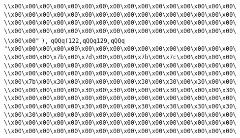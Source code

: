 \verb|\\x00\x00\x00\x00\x00\x00\x00\x00\x00\x00\x00\x00\x00\x00\x00\x00\|\newline
\verb|\\x00\x00\x00\x00\x00\x00\x00\x00\x00\x00\x00\x00\x00\x00\x00\x00\|\newline
\verb|\\x00\x00\x00\x00\x00\x00\x00\x00\x00\x00\x00\x00\x00\x00\x00\x00\|\newline
\verb|\\x00\x00\x00\x00\x00\x00\x00\x00\x00\x00\x00\x00\x00\x00\x00\x00\|\newline
\verb|\\x00\x00"|\newline
\verb|),|\newline
\verb|qQQq(122,qQQq129,qQQq|\newline
\verb|"\x00\x00\x00\x00\x00\x00\x00\x00\x00\x00\x00\x00\x00\x00\x00\x00\|\newline
\verb|\\x00\x00\x00\x7b\x00\x7d\x00\x00\x00\x7b\x00\x7c\x00\x00\x00\x00\|\newline
\verb|\\x00\x00\x00\x00\x00\x00\x00\x00\x00\x00\x00\x00\x00\x00\x00\x00\|\newline
\verb|\\x00\x00\x00\x00\x00\x00\x00\x00\x00\x00\x00\x00\x00\x00\x00\x00\|\newline
\verb|\\x00\x7b\x00\x30\x00\x00\x00\x00\x00\x30\x00\x30\x00\x30\x00\x00\|\newline
\verb|\\x00\x00\x00\x00\x00\x30\x00\x30\x00\x00\x00\x30\x00\x00\x00\x30\|\newline
\verb|\\x00\x00\x00\x00\x00\x00\x00\x00\x00\x00\x00\x00\x00\x00\x00\x00\|\newline
\verb|\\x00\x00\x00\x00\x00\x30\x00\x00\x00\x30\x00\x30\x00\x30\x00\x30\|\newline
\verb|\\x00\x30\x00\x00\x00\x00\x00\x00\x00\x00\x00\x00\x00\x00\x00\x00\|\newline
\verb|\\x00\x00\x00\x00\x00\x00\x00\x00\x00\x00\x00\x00\x00\x00\x00\x00\|\newline
\verb|\\x00\x00\x00\x00\x00\x00\x00\x00\x00\x00\x00\x00\x00\x00\x00\x00\|\newline
